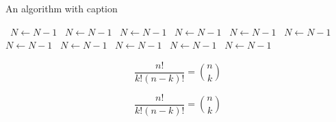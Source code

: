 \documentclass[a4paper]{article}
\begin{document}
\begin{algorithm}
\caption{An algorithm with caption}
\begin{algorithmic}
\    \State $N \gets N - 1$
\    \State $N \gets N - 1$
\    \State $N \gets N - 1$
\    \State $N \gets N - 1$
\    \State $N \gets N - 1$
\    \State $N \gets N - 1$
\    \State $N \gets N - 1$
\    \State $N \gets N - 1$
\    \State $N \gets N - 1$
\    \State $N \gets N - 1$
\    \State $N \gets N - 1$
\EndWhile
\end{algorithmic}
\end{algorithm}

\[ \frac{n!}{k!(n-k)!} = \binom{n}{k} \]

\[ \frac{n!}{k!(n-k)!} = \binom{n}{k} \]
\end{document}
